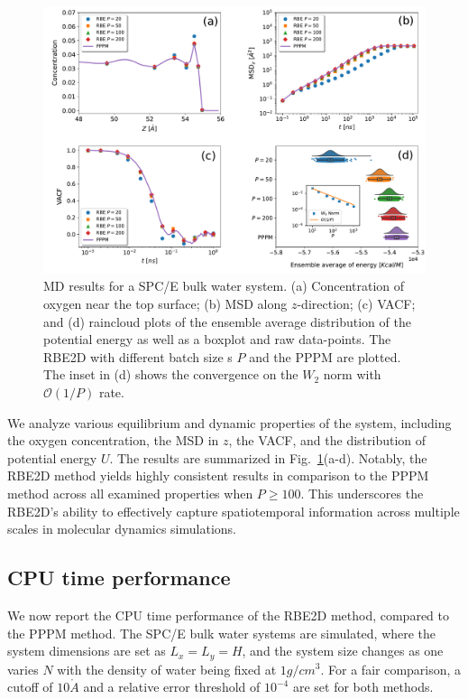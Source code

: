 \begin{figure}[ht!]
\centering
\includegraphics[width=0.90\linewidth]{figs/Density_new.pdf}
	\caption{MD results for a SPC/E bulk water system. (a)  Concentration of oxygen near the top surface; (b)  MSD along $z$-direction; (c)  VACF; and (d)  raincloud plots of the ensemble average distribution of the potential energy as well as a boxplot and raw data-points. The RBE2D with different batch size {s} $P$ and the PPPM are plotted. The inset in (d) shows the convergence on the $W_2$ norm with $\mathcal{O}(1/P)$ rate.}
	\label{fig:Water}
\end{figure}

We analyze various equilibrium and dynamic properties of the system, including the oxygen concentration, the MSD in $z$, the VACF, and the distribution of potential energy $U$.
The results are summarized in Fig.~\ref{fig:Water}(a-d).
Notably, the RBE2D method yields highly consistent results in comparison to the PPPM method across all examined properties when $P \geq 100$. 
This underscores the RBE2D's ability to effectively capture spatiotemporal information across multiple scales in molecular dynamics simulations.

\subsection{CPU time performance}
We now report the CPU time performance of the RBE2D method, compared to the PPPM method. 
The SPC/E bulk water systems are simulated, where
the system dimensions are set as $L_x=L_y=H$,  and the system size changes as one varies $N$ with the density of water being fixed at $1g/cm^3$. For a fair comparison, a cutoff of $10\mathring{A}$ and a relative error threshold of $10^{-4}$ are set for both methods.

